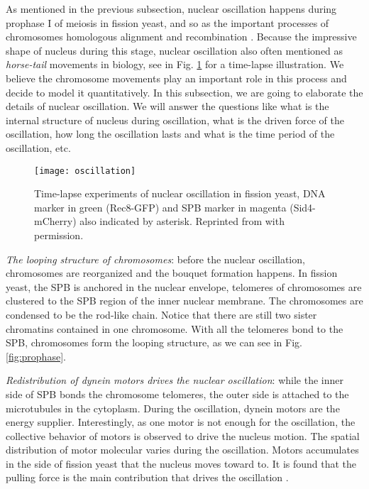 As mentioned in the previous subsection, nuclear oscillation happens during prophase I of meiosis in fission yeast, and so as the important processes of chromosomes homologous alignment and recombination \cite{Ding1998}. Because the impressive shape of nucleus during this stage, nuclear oscillation also often mentioned as \emph{horse-tail} movements in biology\cite{Koszul2009a,Wells2006,Davis2001}, see in Fig. \ref{fig:oscillation} for a time-lapse illustration. We believe the chromosome movements play an important role in this process and decide to model it quantitatively. In this subsection, we are going to elaborate the details of nuclear oscillation. We will answer the questions like what is the internal structure of nucleus during oscillation, what is the driven force of the oscillation, how long the oscillation lasts and what is the time period of the oscillation, etc.
\begin{figure}[htpb]
    \centering
    \texttt{[image: oscillation]}
    \caption{Time-lapse experiments of nuclear oscillation in fission yeast, DNA marker in green (Rec8-GFP) and SPB marker in magenta (Sid4-mCherry) also indicated by asterisk. Reprinted from \cite{Chacon2016} with permission.}
    \label{fig:oscillation}
\end{figure}

\emph{The looping structure of chromosomes}: before the nuclear oscillation, chromosomes are reorganized and the bouquet formation happens. In fission yeast, the SPB is anchored in the nuclear envelope, telomeres of chromosomes are clustered to the SPB region of the inner nuclear membrane. The chromosomes are condensed to be the rod-like chain. Notice that there are still two sister chromatins contained in one chromosome. With all the telomeres bond to the SPB, chromosomes form the looping structure, as we can see in Fig. \ref{fig:prophase}. 

\emph{Redistribution of dynein motors drives the nuclear oscillation}: while the inner side of SPB bonds the chromosome telomeres, the outer side is attached to the microtubules in the cytoplasm. During the oscillation, dynein motors are the energy supplier. Interestingly, as one motor is not enough for the oscillation, the collective behavior of motors is observed to drive the nucleus motion. The spatial distribution of motor molecular varies during the oscillation. Motors accumulates in the side of fission yeast that the nucleus moves toward to. It is found that the pulling force is the main contribution that drives the oscillation \cite{Vogel2009}.

